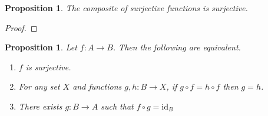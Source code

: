 \documentclass{book}
\let\qed\relax
\newtheorem{prop}[ax]{Proposition}
\theoremstyle{definition}
\newcommand{\id}[1]{\ensuremath{\mathrm{id}_{#1}}}
\begin{document}
\begin{prop}
\label{prop:comp_surj}
The composite of surjective functions is surjective.
\end{prop}

\begin{proof}
\pf
{}
\qed
\end{proof}

\begin{prop}
\label{prop:surjective}
Let $f : A \rightarrow B$. Then the following are equivalent.
\begin{enumerate}
\item $f$ is surjective.
\item For any set $X$ and functions $g,h : B \rightarrow X$, if $g \circ f = h \circ f$ then $g = h$.
\item There exists $g : B \rightarrow A$ such that $f \circ g = \id{B}$
\end{enumerate}
\end{prop}
\end{document}
